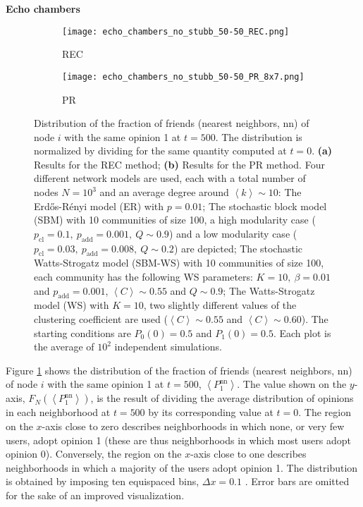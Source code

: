 \documentclass[11 pt , letterpaper , twoside , openright]{book}
\begin{document}
\newpage
\noindent
\textbf{Echo chambers}\\
\begin{figure}[H]
  \begin{subfigure}[b]{0.49\textwidth}
  	\texttt{[image: echo\_chambers\_no\_stubb\_50-50\_REC.png]}
    \caption{REC}
  \end{subfigure}
  \begin{subfigure}[b]{0.49\textwidth}
  	\texttt{[image: echo\_chambers\_no\_stubb\_50-50\_PR\_8x7.png]}
    \caption{PR}
  \end{subfigure}
  \captionsetup{format=plain}
  \caption[Distribution of the fraction of friends (nearest neighbors, nn) of node $i$ with the same opinion 1 at $t=500$, $\left<P_1^{\text{nn}}\right>$, for an initial $50/50$ opinion distribution.]{Distribution of the fraction of friends (nearest neighbors, nn) of node $i$ with the same opinion 1 at $t = 500$. The distribution is normalized by dividing for the same quantity computed at $t=0$. \textbf{(a)} Results for the REC method; \textbf{(b)} Results for the PR method. Four different network models are used, each with a total number of nodes $N = 10^3$ and an average degree around $\left<k\right> \sim 10$: The Erd\H{o}s-R\'{e}nyi model (ER) with $p = 0.01$; The stochastic block model (SBM) with 10 communities of size 100, a high modularity case ($p_{\text{cl}} = 0.1,\ p_{\text{add}} = 0.001,\ Q \sim 0.9$) and a low modularity case ($p_{\text{cl}} = 0.03,\ p_{\text{add}} = 0.008,\ Q \sim 0.2$) are depicted; The stochastic Watts-Strogatz model (SBM-WS) with 10 communities of size 100, each community has the following WS parameters: $K = 10,\ \beta = 0.01$ and $p_{\text{add}} = 0.001$, $\left<C\right> \sim 0.55$ and $Q \sim 0.9$; The Watts-Strogatz model (WS) with $K = 10$, two slightly different values of the clustering coefficient are used ($\left<C\right> \sim 0.55$ and $\left<C\right> \sim 0.60$). The starting conditions are $P_0(0) = 0.5$ and $P_1(0) = 0.5$. Each plot is the average of $10^2$ independent simulations.}
\label{echo_50_50}
\end{figure}
\noindent
Figure \ref{echo_50_50} shows the distribution of the fraction of friends (nearest neighbors, nn) of node $i$ with the same opinion 1 at $t=500$, $\left<P_1^{\text{nn}}\right>$. The value shown on the $y$-axis, $F_N(\left<P_1^{\text{nn}}\right>)$, is the result of dividing the average distribution of opinions in each neighborhood at $t=500$ by its corresponding value at $t=0$. The region on the $x$-axis close to zero describes neighborhoods in which none, or very few users, adopt opinion 1 (these are thus neighborhoods in which most users adopt opinion 0). Conversely, the region on the $x$-axis close to one describes neighborhoods in which a majority of the users adopt opinion 1. The distribution is obtained by imposing ten equispaced bins, $\Delta x = 0.1$ \cite{Perra2019}. Error bars are omitted for the sake of an improved visualization.\\
\end{document}
